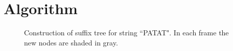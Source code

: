 \section{Algorithm}

\newcommand{\T}{\ensuremath{\mathcal{T}}}
\newcommand{\N}{\ensuremath{\mathcal{N}}}
\newcommand{\M}{\ensuremath{\mathcal{M}}}
\newcommand{\PP}{\ensuremath{\mathcal{P}}}
\newcommand{\nc}{\ensuremath{nc}}
\newcommand{\RS}{\ensuremath{\mathcal{R}\mathcal{S}}}
\newcommand{\D}{\ensuremath{\mathcal{D}}}
\newcommand{\la}{\ensuremath{\leftarrow}}
\newcommand{\G}{\ensuremath{\mathcal{G}}}
\newcommand{\IS}{\ensuremath{\mathcal{I}\mathcal{S}}}
\newcommand{\Seq}{\ensuremath{\mathcal{S}}}
\newcommand{\dd}{\ensuremath{\delta}}

\begin{figure}[t] 
	\begin{center}
		\caption{Construction of suffix tree for string ``PATAT".  In each frame the new nodes are shaded in gray.}
		\label{fig:suffix_tree}
	\end{center} 
\end{figure} 

